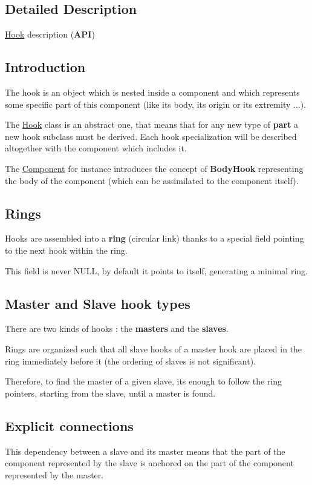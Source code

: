\subsection{Detailed Description}
\mbox{\hyperlink{classHurricane_1_1Hook}{Hook}} description ({\bfseries A\+PI}) 

\hypertarget{classHurricane_1_1Hook_secHookIntro}{}\subsection{Introduction}\label{classHurricane_1_1Hook_secHookIntro}
The hook is an object which is nested inside a component and which represents some specific part of this component (like its body, its origin or its extremity ...).

The \mbox{\hyperlink{classHurricane_1_1Hook}{Hook}} class is an abstract one, that means that for any new type of {\bfseries part} a new hook subclass must be derived. Each hook specialization will be described altogether with the component which includes it.

The \mbox{\hyperlink{classHurricane_1_1Component}{Component}} for instance introduces the concept of {\bfseries Body\+Hook} representing the body of the component (which can be assimilated to the component itself).\hypertarget{classHurricane_1_1Hook_secHookRings}{}\subsection{Rings}\label{classHurricane_1_1Hook_secHookRings}
Hooks are assembled into a {\bfseries ring} (circular link) thanks to a special field pointing to the next hook within the ring.

This field is never N\+U\+LL, by default it points to itself, generating a minimal ring.\hypertarget{classHurricane_1_1Hook_secHookMasterAndSlaveHookTypes}{}\subsection{Master and Slave hook types}\label{classHurricane_1_1Hook_secHookMasterAndSlaveHookTypes}
There are two kinds of hooks \+: the {\bfseries masters} and the {\bfseries slaves}.

Rings are organized such that all slave hooks of a master hook are placed in the ring immediately before it (the ordering of slaves is not significant).

Therefore, to find the master of a given slave, it\textquotesingle{}s enough to follow the ring pointers, starting from the slave, until a master is found.\hypertarget{classHurricane_1_1Hook_secHookExplicitConnections}{}\subsection{Explicit connections}\label{classHurricane_1_1Hook_secHookExplicitConnections}
This dependency between a slave and its master means that the part of the component represented by the slave is anchored on the part of the component represented by the master.

